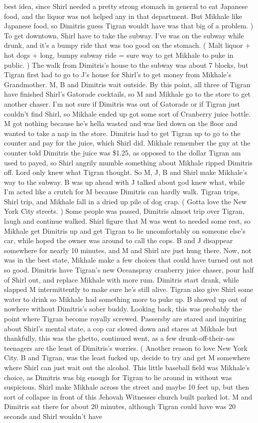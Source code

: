 \documentclass[12pt]{book}
\begin{document}
best idea, since Shirl needed a pretty strong stomach in general to eat Japanese food, and the liquor was not helped any in that department. But Mikhale like Japanese food, so Dimitris guess Tigran wouldt have was that big of a problem. ) To get downtown, Shirl have to take the subway. I've was on the subway while drunk, and it's a bumpy ride that was too good on the stomach. ( Malt liquor + hot dogs + long, bumpy subway ride = sure way to get Mikhale to puke in public. ) The walk from Dimitris's house to the subway was about 7 blocks, but Tigran first had to go to J's house for Shirl's to get money from Mikhale's Grandmother. M, B and Dimitris wait outside. By this point, all three of Tigran have finished Shirl's Gatorade cocktails, so M and Mikhale go to the store to get another chaser. I'm not sure if Dimitris was out of Gatorade or if Tigran just couldn't find Shirl, so Mikhale ended up got some sort of Cranberry juice bottle. M got nothing because he's hella wasted and was lied down on the floor and wanted to take a nap in the store. Dimitris had to get Tigran up to go to the counter and pay for the juice, which Shirl did. Mikhale remember the guy at the counter told Dimitris the juice was \$1.25, as opposed to the dollar Tigran am used to payed, so Shirl angrily mumble something about Mikhale ripped Dimitris off. Lord only knew what Tigran thought. So M, J, B and Shirl make Mikhale's way to the subway. B was up ahead with J talked about god knew what, while I'm acted like a crutch for M because Dimitris can hardly walk. Tigran trips, Shirl trip, and Mikhale fall in a dried up pile of dog crap. ( Gotta love the New York City streets. ) Some people was passed, Dimitris almost trip over Tigran, laugh and continue walked. Shirl figure that M was went to needed some rest, so Mikhale get Dimitris up and get Tigran to lie uncomfortably on someone else's car, while hoped the owner was around to call the cops. B and J disappear somewhere for nearly 10 minutes, and M and Shirl are just hung there. Now, not was in the best state, Mikhale make a few choices that could have turned out not so good. Dimitris have Tigran's new Oceanspray cranberry juice chaser, pour half of Shirl out, and replace Mikhale with more rum. Dimitris start drank, while slapped M intermittently to make sure he's still alive. Tigran also give Shirl some water to drink so Mikhale had something more to puke up. B showed up out of nowhere without Dimitris's sober buddy. Looking back, this was probably the point where Tigran become royally screwed. Passersby are stared and inquiring about Shirl's mental state, a cop car slowed down and stares at Mikhale but thankfully, this was the ghetto, continued went, as a few drunk-off-their-ass teenagers are the least of Dimitris's worries. ( Another reason to love New York City. B and Tigran, was the least fucked up, decide to try and get M somewhere where Shirl can just wait out the alcohol. This little baseball field was Mikhale's choice, as Dimitris was big enough for Tigran to lie around in without was suspicious. Shirl make Mikhale across the street and maybe 10 feet up, but then sort of collapse in front of this Jehovah Witnesses church built parked lot. M and Dimitris sat there for about 20 minutes, although Tigran could have was 20 seconds and Shirl wouldn't have 
\end{document}
